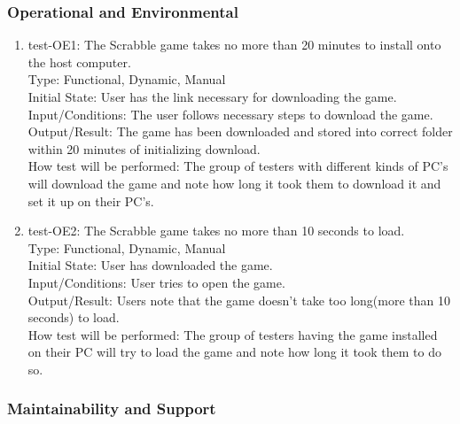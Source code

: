 \documentclass[12pt, titlepage]{article}
\begin{document}
\subsubsection{Operational and Environmental}
\begin{enumerate}

\item{test-OE1: The Scrabble game takes no more than 20 minutes to install onto the host computer.}\\
    Type: Functional, Dynamic, Manual\\ %
    Initial State: User has the link necessary for downloading the game.\\
    Input/Conditions: The user follows necessary steps to download the game.\\
    Output/Result: The game has been downloaded and stored into correct folder within 20 minutes of initializing download. \\
    How test will be performed: The group of testers with different kinds of PC's will download the game and note how long it took them to download it and set it up on their PC's.\\
    
\item{test-OE2: The Scrabble game takes no more than 10 seconds to load.}\\
    Type: Functional, Dynamic, Manual\\ %
    Initial State: User has downloaded the game.\\
    Input/Conditions: User tries to open the game.\\
    Output/Result: Users note that the game doesn't take too long(more than 10 seconds) to load. \\
    How test will be performed: The group of testers having the game installed on their PC will try to load the game and note how long it took them to do so.\\
    
\end{enumerate}

\subsubsection{Maintainability and Support}
\end{document}

